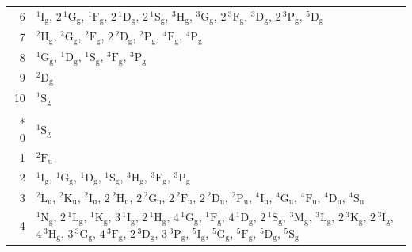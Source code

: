 \documentclass[10pt,a4paper]{article}
\makeatletter
\def\grouprule#1#2{\noalign{\marks\LTgroupmarks{\the\belowrulesep}\nobreak\vskip#1%
  \vskip\aboverulesep}\multispan\LT@cols\unskip{\leaders\hrule\@height#2\hfill\kern\z@}\cr
  \noalign{\penalty\LTrulebreak\vskip\belowrulesep\global\@lastruleclass\z@}}
\numberwithin{equation}{section}
\newcommand{\spec}[1]{\mathrm{#1}}
\newcommand{\ptag}[1]{\mathrm{#1}}
\newcommand{\orbital}[1]{\mathrm{#1}}
\newcommand{\term}[2]{{}^{#1}#2}
\newlength{\fillwidth}\newlength{\cellwidth}\newlength{\colwidth}
\makeatother
\begin{document}
{\begin{longtable}{@{}r>{\RaggedRight\arraybackslash}p{\fillwidth}@{}}
6 & $\term{1}{\spec{I}_{\ptag{g}}}$, $2\,\term{1}{\spec{G}_{\ptag{g}}}$, $\term{1}{\spec{F}_{\ptag{g}}}$, $2\,\term{1}{\spec{D}_{\ptag{g}}}$, $2\,\term{1}{\spec{S}_{\ptag{g}}}$, $\term{3}{\spec{H}_{\ptag{g}}}$, $\term{3}{\spec{G}_{\ptag{g}}}$, $2\,\term{3}{\spec{F}_{\ptag{g}}}$, $\term{3}{\spec{D}_{\ptag{g}}}$, $2\,\term{3}{\spec{P}_{\ptag{g}}}$, $\term{5}{\spec{D}_{\ptag{g}}}$\\
7 & $\term{2}{\spec{H}_{\ptag{g}}}$, $\term{2}{\spec{G}_{\ptag{g}}}$, $\term{2}{\spec{F}_{\ptag{g}}}$, $2\,\term{2}{\spec{D}_{\ptag{g}}}$, $\term{2}{\spec{P}_{\ptag{g}}}$, $\term{4}{\spec{F}_{\ptag{g}}}$, $\term{4}{\spec{P}_{\ptag{g}}}$\\
8 & $\term{1}{\spec{G}_{\ptag{g}}}$, $\term{1}{\spec{D}_{\ptag{g}}}$, $\term{1}{\spec{S}_{\ptag{g}}}$, $\term{3}{\spec{F}_{\ptag{g}}}$, $\term{3}{\spec{P}_{\ptag{g}}}$\\
9 & $\term{2}{\spec{D}_{\ptag{g}}}$\\
10 & $\term{1}{\spec{S}_{\ptag{g}}}$\\
\grouprule{0pt}{\lightrulewidth}\multicolumn{2}{@{}c@{}}{$\orbital{f}^{n}$, $l = 3$}\\*
0 & $\term{1}{\spec{S}_{\ptag{g}}}$\\
1 & $\term{2}{\spec{F}_{\ptag{u}}}$\\
2 & $\term{1}{\spec{I}_{\ptag{g}}}$, $\term{1}{\spec{G}_{\ptag{g}}}$, $\term{1}{\spec{D}_{\ptag{g}}}$, $\term{1}{\spec{S}_{\ptag{g}}}$, $\term{3}{\spec{H}_{\ptag{g}}}$, $\term{3}{\spec{F}_{\ptag{g}}}$, $\term{3}{\spec{P}_{\ptag{g}}}$\\
3 & $\term{2}{\spec{L}_{\ptag{u}}}$, $\term{2}{\spec{K}_{\ptag{u}}}$, $\term{2}{\spec{I}_{\ptag{u}}}$, $2\,\term{2}{\spec{H}_{\ptag{u}}}$, $2\,\term{2}{\spec{G}_{\ptag{u}}}$, $2\,\term{2}{\spec{F}_{\ptag{u}}}$, $2\,\term{2}{\spec{D}_{\ptag{u}}}$, $\term{2}{\spec{P}_{\ptag{u}}}$, $\term{4}{\spec{I}_{\ptag{u}}}$, $\term{4}{\spec{G}_{\ptag{u}}}$, $\term{4}{\spec{F}_{\ptag{u}}}$, $\term{4}{\spec{D}_{\ptag{u}}}$, $\term{4}{\spec{S}_{\ptag{u}}}$\\
4 & $\term{1}{\spec{N}_{\ptag{g}}}$, $2\,\term{1}{\spec{L}_{\ptag{g}}}$, $\term{1}{\spec{K}_{\ptag{g}}}$, $3\,\term{1}{\spec{I}_{\ptag{g}}}$, $2\,\term{1}{\spec{H}_{\ptag{g}}}$, $4\,\term{1}{\spec{G}_{\ptag{g}}}$, $\term{1}{\spec{F}_{\ptag{g}}}$, $4\,\term{1}{\spec{D}_{\ptag{g}}}$, $2\,\term{1}{\spec{S}_{\ptag{g}}}$, $\term{3}{\spec{M}_{\ptag{g}}}$, $\term{3}{\spec{L}_{\ptag{g}}}$, $2\,\term{3}{\spec{K}_{\ptag{g}}}$, $2\,\term{3}{\spec{I}_{\ptag{g}}}$, $4\,\term{3}{\spec{H}_{\ptag{g}}}$, $3\,\term{3}{\spec{G}_{\ptag{g}}}$, $4\,\term{3}{\spec{F}_{\ptag{g}}}$, $2\,\term{3}{\spec{D}_{\ptag{g}}}$, $3\,\term{3}{\spec{P}_{\ptag{g}}}$, $\term{5}{\spec{I}_{\ptag{g}}}$, $\term{5}{\spec{G}_{\ptag{g}}}$, $\term{5}{\spec{F}_{\ptag{g}}}$, $\term{5}{\spec{D}_{\ptag{g}}}$, $\term{5}{\spec{S}_{\ptag{g}}}$\\

\end{longtable}}
\end{document}
